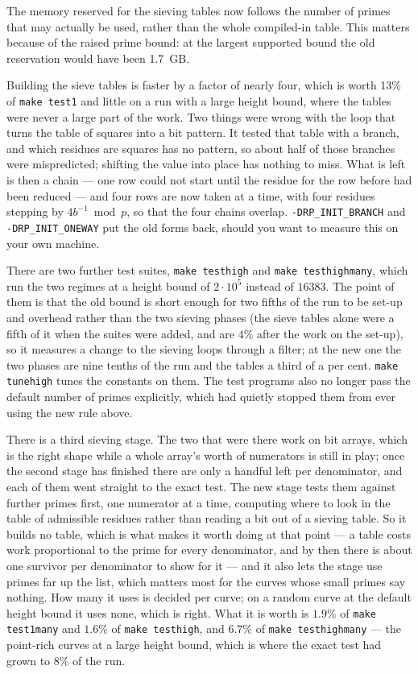 \documentclass[12pt,a4paper,oneside]{amsart}
\begin{document}
The memory reserved for the sieving tables now follows the number of primes
that may actually be used, rather than the whole compiled-in table. This
matters because of the raised prime bound: at the largest supported bound the
old reservation would have been 1.7~GB.

Building the sieve tables is faster by a factor of nearly four, which is worth
13\% of \texttt{make test1} and little on a run with a large height bound,
where the tables were never a large part of the work. Two things were wrong
with the loop that turns the table of squares into a bit pattern. It tested
that table with a branch, and which residues are squares has no pattern, so
about half of those branches were mispredicted; shifting the value into place
has nothing to miss. What is left is then a chain --- one row could not start
until the residue for the row before had been reduced --- and four rows are now
taken at a time, with four residues stepping by $4b^{-1} \bmod p$, so that the
four chains overlap. \verb+-DRP_INIT_BRANCH+ and \verb+-DRP_INIT_ONEWAY+ put
the old forms back, should you want to measure this on your own machine.

There are two further test suites, \texttt{make testhigh} and \texttt{make
testhighmany}, which run the two regimes at a height bound of $2\cdot10^5$
instead of $16383$. The point of them is that the old bound is short enough
for two fifths of the run to be set-up and overhead rather than the two
sieving phases (the sieve tables alone were a fifth of it when the suites were
added, and are $4\%$ after the work on the set-up), so it measures a change to
the sieving loops through a filter; at the new one the two phases are nine
tenths of the run and the tables a third of a per cent. \texttt{make
tunehigh} tunes the constants on them. The test programs also no longer pass
the default number of primes
explicitly, which had quietly stopped them from ever using the new rule above.

There is a third sieving stage. The two that were there work on bit arrays,
which is the right shape while a whole array's worth of numerators is still
in play; once the second stage has finished there are only a handful left per
denominator, and each of them went straight to the exact test. The new stage
tests them against further primes first, one numerator at a time, computing
where to look in the table of admissible residues rather than reading a bit
out of a sieving table. So it builds no table, which is what makes it worth
doing at that point --- a table costs work proportional to the prime for
every denominator, and by then there is about one survivor per denominator to
show for it --- and it also lets the stage use primes far up the list, which
matters most for the curves whose small primes say nothing. How many it uses
is decided per curve; on a random curve at the default height bound it uses
none, which is right. What it is worth is $1.9\%$ of \texttt{make test1many}
and $1.6\%$ of \texttt{make testhigh}, and $6.7\%$ of
\texttt{make testhighmany} --- the point-rich curves at a large height bound,
which is where the exact test had grown to $8\%$ of the run.
\end{document}
